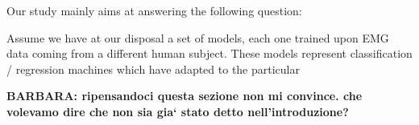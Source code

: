 Our study mainly aims at answering the following question: 




Assume we have at our disposal a set of models, each one trained upon
EMG data coming from a different human subject. These models represent
classification / regression machines which have adapted to the
particular 

\textbf{BARBARA: ripensandoci questa sezione non mi convince. che
volevamo dire che non sia gia` stato detto nell'introduzione?}
